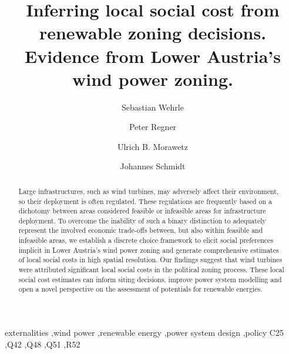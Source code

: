 \documentclass[review, a4paper, 12pt, authoryear, times]{elsarticle}
\begin{document}
\begin{frontmatter}
        \title{Inferring local social cost from renewable zoning decisions. Evidence from Lower Austria's wind power zoning.}
        \author[1]{Sebastian Wehrle}
        \author[1]{Peter Regner}
        \author[1]{Ulrich B. Morawetz}
        \author[1]{Johannes Schmidt}
        \address[1]{Institute for Sustainable Economic Development, University of Natural Resources and Life Sciences,
        Feistmantelstrasse 4, 1180 Vienna, Austria}
        \begin{abstract}
        Large infrastructures, such as wind turbines, may adversely affect their environment, so their deployment is often regulated. 
        These regulations are frequently based on a dichotomy between areas considered feasible or infeasible areas for infrastructure deployment. To overcome the inability of such a binary distinction to adequately represent the involved economic trade-offs between, but also within feasible and infeasible areas, we establish a discrete choice framework to elicit social preferences implicit in Lower Austria's wind power zoning and generate comprehensive estimates of local social costs in high spatial resolution.
        Our findings suggest that wind turbines were attributed significant local social costs in the political zoning process. These local social cost estimates can inform siting decisions, improve power system modelling and open a novel perspective on the assessment of potentials for renewable energies.
        \end{abstract}

        \begin{keyword}
            externalities \sep wind power \sep renewable energy \sep power system design \sep policy
            \JEL C25 \sep Q42 \sep Q48 \sep Q51 \sep R52
        \end{keyword}
\end{frontmatter}
\end{document}
